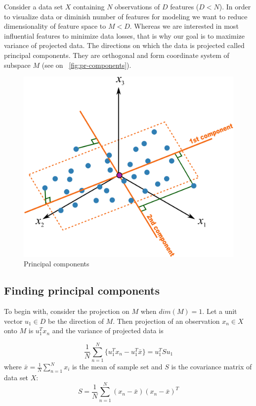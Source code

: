 Consider a data set $X$ containing $N$ observations of $D$ features ($D<N$). In order to visualize data or diminish number of features for modeling we want to reduce dimensionality of feature space to $M<D$. Whereas we are interested in most influential features to minimize data losses, that is why our goal is to maximize variance of projected data. The directions on which the data is projected called principal components. They are orthogonal and form coordinate system of subspace $M$ (see on ~\autoref{fig:pr-components}).

\begin{figure}[h]
	\centering
	\includegraphics[scale=0.3]{img/geometric-PCA-8-both-components-with-plane.png}
	\caption{\label{fig:pr-components}Principal components}
\end{figure}

\subsection{Finding principal components}
To begin with, consider the projection on $M$ when $dim(M)=1$. Let a unit vector $u_1 \in D$ be the direction of $M$. Then projection of an observation $x_n\in X$ onto $M$ is $u_1^Tx_n$ and the variance of projected data is

\begin{equation}\label{var_proj}
 \dfrac{1}{N}\sum_{n=1}^{N}{\{u_1^T x_n - u_1^T \bar{x}\}}=u_1^T S u_1
\end{equation}	 
%
where $\bar{x} = \frac{1}{N}\sum_{n=1}^{N} x_i$ is the mean of sample set and $S$ is the covariance matrix of data set $X$:
\begin{equation}\label{cov_matrix_s}
S =  \dfrac{1}{N}\sum_{n=1}^{N}{(x_n - \bar{x})(x_n - \bar{x})^T}
\end{equation}

